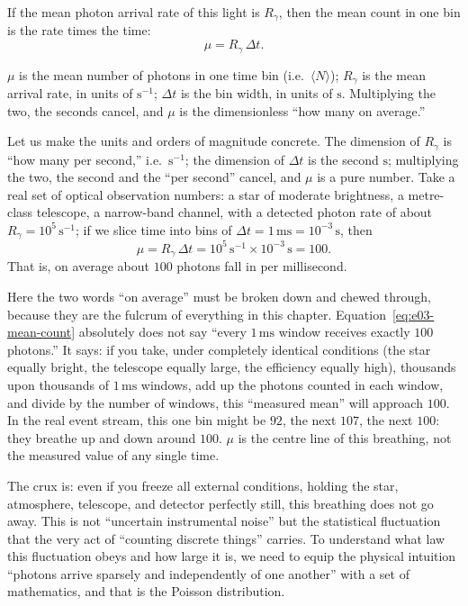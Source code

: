 If the mean photon arrival rate of this light is $R_\gamma$, then the mean count in one bin is the rate times the time:
\begin{equation}
  \mu=R_\gamma\,\Delta t .
  \label{eq:e03-mean-count}
\end{equation}
\begin{formulaexplain}
$\mu$ is the mean number of photons in one time bin (i.e.\ $\langle N\rangle$); $R_\gamma$ is the mean arrival rate, in units of $\mathrm{s^{-1}}$; $\Delta t$ is the bin width, in units of $\mathrm{s}$. Multiplying the two, the seconds cancel, and $\mu$ is the dimensionless ``how many on average.''
\end{formulaexplain}
Let us make the units and orders of magnitude concrete. The dimension of $R_\gamma$ is ``how many per second,'' i.e.\ $\mathrm{s^{-1}}$; the dimension of $\Delta t$ is the second $\mathrm{s}$; multiplying the two, the second and the ``per second'' cancel, and $\mu$ is a pure number. Take a real set of optical observation numbers: a star of moderate brightness, a metre-class telescope, a narrow-band channel, with a detected photon rate of about $R_\gamma=10^{5}\,\mathrm{s^{-1}}$; if we slice time into bins of $\Delta t=1\,\mathrm{ms}=10^{-3}\,\mathrm{s}$, then
\[
  \mu=R_\gamma\,\Delta t=10^{5}\,\mathrm{s^{-1}}\times10^{-3}\,\mathrm{s}=100 .
\]
That is, on average about $100$ photons fall in per millisecond.

Here the two words ``on average'' must be broken down and chewed through, because they are the fulcrum of everything in this chapter. Equation~\eqref{eq:e03-mean-count} absolutely does not say ``every $1\,\mathrm{ms}$ window receives exactly $100$ photons.'' It says: if you take, under completely identical conditions (the star equally bright, the telescope equally large, the efficiency equally high), thousands upon thousands of $1\,\mathrm{ms}$ windows, add up the photons counted in each window, and divide by the number of windows, this ``measured mean'' will approach $100$. In the real event stream, this one bin might be $92$, the next $107$, the next $100$: they breathe up and down around $100$. $\mu$ is the centre line of this breathing, not the measured value of any single time.

The crux is: even if you freeze all external conditions, holding the star, atmosphere, telescope, and detector perfectly still, this breathing does not go away. This is not ``uncertain instrumental noise'' but the statistical fluctuation that the very act of ``counting discrete things'' carries. To understand what law this fluctuation obeys and how large it is, we need to equip the physical intuition ``photons arrive sparsely and independently of one another'' with a set of mathematics, and that is the Poisson distribution.

